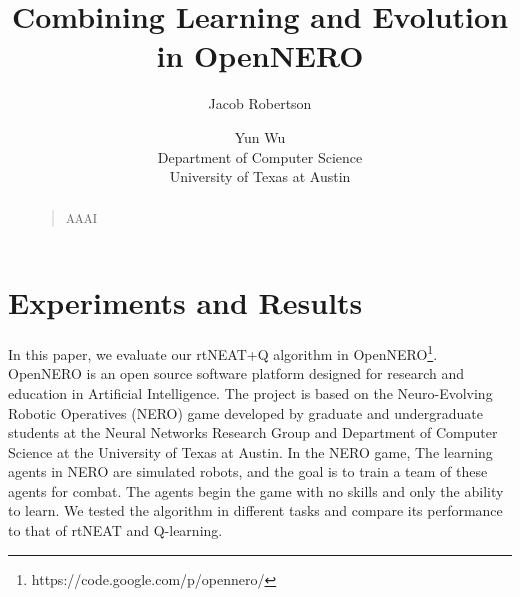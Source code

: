 \documentclass[letterpaper]{article}
\begin{document}
%
\title{Combining Learning and Evolution in OpenNERO}
\author{Jacob Robertson \and Yun Wu\\
Department of Computer Science\\
University of Texas at Austin\\
}
\maketitle
\begin{abstract}
\begin{quote}
AAAI
\end{quote}
\end{abstract}

\section{Experiments and Results}
In this paper, we evaluate our rtNEAT+Q algorithm in OpenNERO\footnote{https://code.google.com/p/opennero/}. OpenNERO is an open source software platform designed for research and education in Artificial Intelligence. The project is based on the Neuro-Evolving Robotic Operatives (NERO) game developed by graduate and undergraduate students at the Neural Networks Research Group and Department of Computer Science at the University of Texas at Austin. In the NERO game, The learning agents in NERO are simulated robots, and the goal is to train a team of these agents for combat. The agents begin the game with no skills and only the ability to learn. We tested the algorithm in different tasks and compare its performance to that of rtNEAT and Q-learning.
\end{document}
